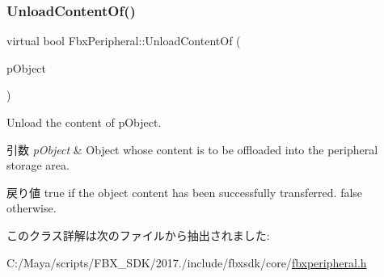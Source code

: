 \subsubsection{\texorpdfstring{Unload\+Content\+Of()}{UnloadContentOf()}}
{\footnotesize\ttfamily virtual bool Fbx\+Peripheral\+::\+Unload\+Content\+Of (\begin{DoxyParamCaption}\item[{\hyperlink{class_fbx_object}{Fbx\+Object} $\ast$}]{p\+Object }\end{DoxyParamCaption})\hspace{0.3cm}{\ttfamily [pure virtual]}}

Unload the content of p\+Object. 
\begin{DoxyParams}{引数}
{\em p\+Object} & Object whose content is to be offloaded into the peripheral storage area. \\
\hline
\end{DoxyParams}
\begin{DoxyReturn}{戻り値}
{\ttfamily true} if the object content has been successfully transferred. {\ttfamily false} otherwise. 
\end{DoxyReturn}


このクラス詳解は次のファイルから抽出されました\+:\begin{DoxyCompactItemize}
\item 
C\+:/\+Maya/scripts/\+F\+B\+X\+\_\+\+S\+D\+K/2017./include/fbxsdk/core/\hyperlink{fbxperipheral_8h}{fbxperipheral.\+h}\end{DoxyCompactItemize}
